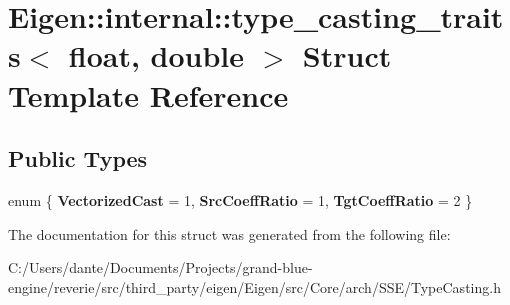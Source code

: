 \hypertarget{struct_eigen_1_1internal_1_1type__casting__traits_3_01float_00_01double_01_4}{}\section{Eigen\+::internal\+::type\+\_\+casting\+\_\+traits$<$ float, double $>$ Struct Template Reference}
\label{struct_eigen_1_1internal_1_1type__casting__traits_3_01float_00_01double_01_4}
\subsection*{Public Types}
\begin{DoxyCompactItemize}
\item 
\mbox{\label{struct_eigen_1_1internal_1_1type__casting__traits_3_01float_00_01double_01_4_a117abb2ace005f0caf16f3c0a8a8d42e}} 
enum \{ {\bfseries Vectorized\+Cast} = 1, 
{\bfseries Src\+Coeff\+Ratio} = 1, 
{\bfseries Tgt\+Coeff\+Ratio} = 2
 \}
\end{DoxyCompactItemize}


The documentation for this struct was generated from the following file\+:\begin{DoxyCompactItemize}
\item 
C\+:/\+Users/dante/\+Documents/\+Projects/grand-\/blue-\/engine/reverie/src/third\+\_\+party/eigen/\+Eigen/src/\+Core/arch/\+S\+S\+E/Type\+Casting.\+h\end{DoxyCompactItemize}
